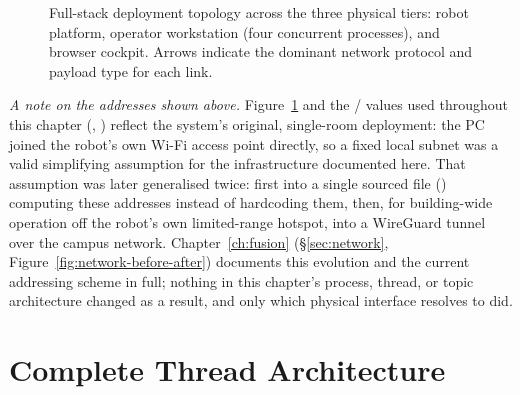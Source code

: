\begin{figure}[htbp]
{}
\caption{Full-stack deployment topology across the three physical tiers: robot platform, operator workstation (four concurrent processes), and browser cockpit. Arrows indicate the dominant network protocol and payload type for each link.}
\label{fig:deployment-topology}
\end{figure}

\emph{A note on the addresses shown above.} Figure~\ref{fig:deployment-topology}
and the / values used throughout this
chapter (, ) reflect the system's original,
single-room deployment: the PC joined the robot's own Wi-Fi access point
directly, so a fixed local subnet was a valid simplifying assumption for the
infrastructure documented here. That assumption was later generalised
twice: first into a single sourced file ()
computing these addresses instead of hardcoding them, then, for
building-wide operation off the robot's own limited-range hotspot, into a
WireGuard tunnel over the campus network. Chapter~\ref{ch:fusion}
(\S\ref{sec:network}, Figure~\ref{fig:network-before-after}) documents this
evolution and the current addressing scheme in full; nothing in this
chapter's process, thread, or topic architecture changed as a result, and
only which physical interface  resolves to did.

\section{Complete Thread Architecture}

